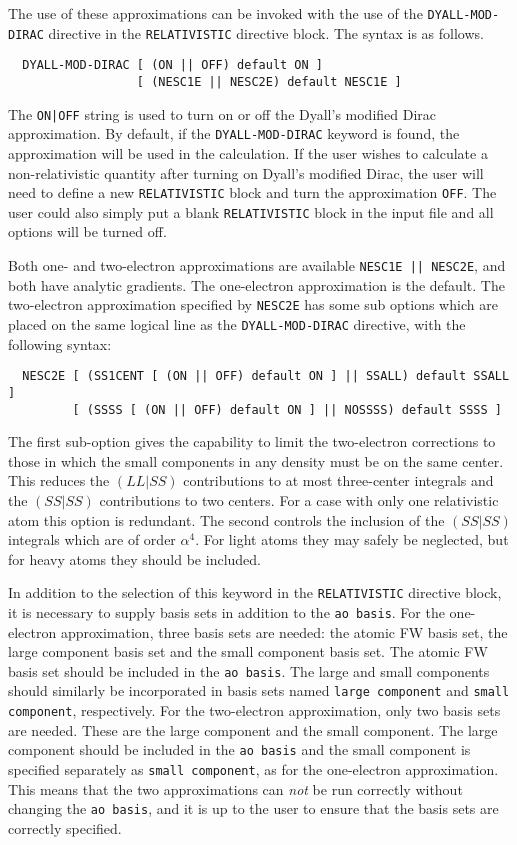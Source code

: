 The use of these approximations can be invoked with the use of the
\verb+DYALL-MOD-DIRAC+ directive in the \verb+RELATIVISTIC+ directive block.
The syntax is as follows.

\begin{verbatim}
  DYALL-MOD-DIRAC [ (ON || OFF) default ON ] 
                  [ (NESC1E || NESC2E) default NESC1E ]
\end{verbatim}

The \verb+ON|OFF+ string is used to turn on or off the
Dyall's modified Dirac approximation. By default, if the \verb+DYALL-MOD-DIRAC+
keyword is found, the approximation will be used in the calculation.
If the user wishes to calculate a non-relativistic quantity after turning
on Dyall's modified Dirac, the user will need to define a new 
\verb+RELATIVISTIC+
block and turn the approximation \verb+OFF+.  The user could also simply
put a blank \verb+RELATIVISTIC+ block in the input file and all options 
will be turned off.

Both one- and two-electron approximations are available
\verb+NESC1E || NESC2E+, and both have
analytic gradients. The one-electron approximation is the default.
The two-electron approximation specified by \verb+NESC2E+ has some sub
options which are placed on the same logical line as the
\verb+DYALL-MOD-DIRAC+ directive, with the following syntax:

\begin{verbatim}
  NESC2E [ (SS1CENT [ (ON || OFF) default ON ] || SSALL) default SSALL ]
         [ (SSSS [ (ON || OFF) default ON ] || NOSSSS) default SSSS ]
\end{verbatim}

The first sub-option gives the capability to limit the two-electron
corrections to those in which the small components in any density must be on
the same center.  This reduces the $(LL|SS)$ contributions to at most
three-center integrals and the $(SS|SS)$ contributions to two centers. For a
case with only one relativistic atom this option is redundant. The second
controls the inclusion of the $(SS|SS)$ integrals which are of order
$\alpha^4$. For light atoms they may safely be neglected, but for heavy
atoms they should be included. 

In addition to the selection of this keyword in the \verb+RELATIVISTIC+
directive block, it is necessary to supply basis sets in addition to the
\verb+ao basis+. For the one-electron approximation, three basis sets are
needed: the atomic FW basis set, the large component basis set and the small
component basis set. The atomic FW basis set should be included in the
\verb+ao basis+.
The large and small components should similarly be incorporated
in basis sets named \verb+large component+ and \verb+small component+,
respectively. For the two-electron approximation, only two basis sets are
needed. These are the large component and the small component. The large component
should be included in the \verb+ao basis+ and the small component
is specified separately as \verb+small component+, as for the one-electron
approximation. This means that the two approximations can {\it not} be run
correctly without changing the \verb+ao basis+, and it is up to the user to
ensure that the basis sets are correctly specified.

